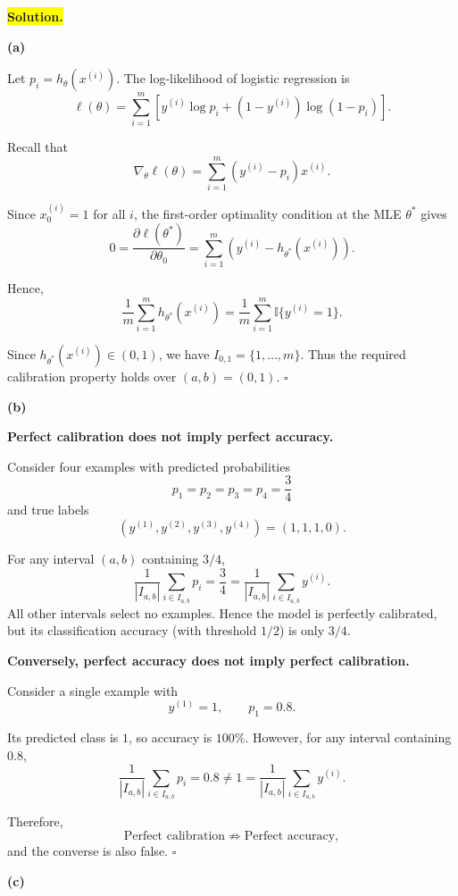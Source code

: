 \documentclass[11pt]{article}
\begin{document}
\medskip
\noindent\colorbox{yellow}{\textbf{Solution.}}
\vspace{3mm}

\noindent\textbf{(a)}

Let $p_i=h_\theta(x^{(i)})$. The log-likelihood of
logistic regression is
\[
\ell(\theta)
=
\sum_{i=1}^{m}
\left[
y^{(i)}\log p_i+
(1-y^{(i)})\log(1-p_i)
\right].
\]

Recall that
\[
\nabla_\theta\ell(\theta)
=
\sum_{i=1}^{m}
(y^{(i)}-p_i)x^{(i)}.
\]

Since $x_0^{(i)}=1$ for all $i$, the first-order
optimality condition at the MLE $\theta^*$ gives
\[
0=
\frac{\partial\ell(\theta^*)}{\partial\theta_0}
=
\sum_{i=1}^{m}
\left(y^{(i)}-h_{\theta^*}(x^{(i)})\right).
\]

Hence,
\[
\boxed{
\frac{1}{m}\sum_{i=1}^{m}
h_{\theta^*}(x^{(i)})
=
\frac{1}{m}\sum_{i=1}^{m}
\mathbb I\{y^{(i)}=1\}.
}
\]

Since $h_{\theta^*}(x^{(i)})\in(0,1)$,
we have $I_{0,1}=\{1,\ldots,m\}$.
Thus the required calibration property holds
over $(a,b)=(0,1)$.
\hfill$\square$

\bigskip
\noindent\textbf{(b)}

\textbf{Perfect calibration does not imply
perfect accuracy.}

Consider four examples with predicted probabilities
\[
p_1=p_2=p_3=p_4=\frac34
\]
and true labels
\[
(y^{(1)},y^{(2)},y^{(3)},y^{(4)})
=(1,1,1,0).
\]

For any interval $(a,b)$ containing $3/4$,
\[
\frac{1}{|I_{a,b}|}
\sum_{i\in I_{a,b}}p_i
=
\frac34
=
\frac{1}{|I_{a,b}|}
\sum_{i\in I_{a,b}}y^{(i)}.
\]
All other intervals select no examples.
Hence the model is perfectly calibrated,
but its classification accuracy (with threshold $1/2$)
is only $3/4$.

\medskip
\noindent\textbf{Conversely, perfect accuracy does
not imply perfect calibration.}

Consider a single example with
\[
y^{(1)}=1,\qquad p_1=0.8.
\]

Its predicted class is $1$, so accuracy is $100\%$.
However, for any interval containing $0.8$,
\[
\frac{1}{|I_{a,b}|}
\sum_{i\in I_{a,b}}p_i
=0.8\neq1
=
\frac{1}{|I_{a,b}|}
\sum_{i\in I_{a,b}}y^{(i)}.
\]

Therefore,
\[
\boxed{
\text{Perfect calibration}
\not\Rightarrow
\text{Perfect accuracy},
}
\]
and the converse is also false.
\hfill$\square$

\bigskip
\noindent\textbf{(c)}
\end{document}
